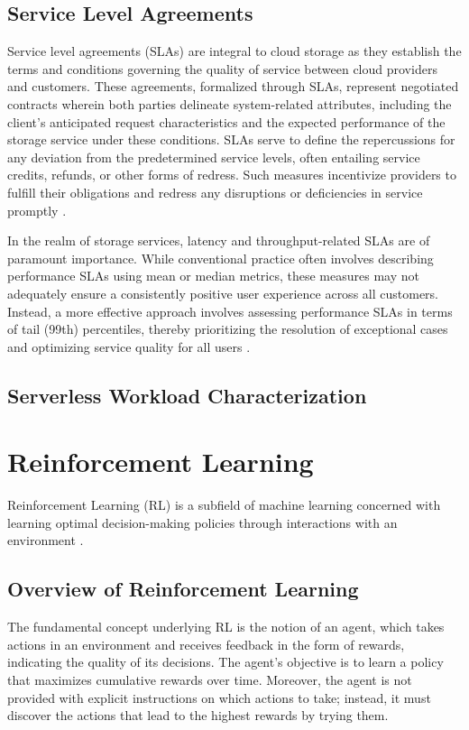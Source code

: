 \subsection{Service Level Agreements}
Service level agreements (SLAs) are integral to cloud storage as they establish the terms and conditions governing the quality of service between cloud providers and customers. These agreements, formalized through SLAs, represent negotiated contracts wherein both parties delineate system-related attributes, including the client's anticipated request characteristics and the expected performance of the storage service under these conditions. SLAs serve to define the repercussions for any deviation from the predetermined service levels, often entailing service credits, refunds, or other forms of redress. Such measures incentivize providers to fulfill their obligations and redress any disruptions or deficiencies in service promptly \cite{DeCandia2007,180275,tariq2020sequoia}.

In the realm of storage services, latency and throughput-related SLAs are of paramount importance. While conventional practice often involves describing performance SLAs using mean or median metrics, these measures may not adequately ensure a consistently positive user experience across all customers. Instead, a more effective approach involves assessing performance SLAs in terms of tail (99th) percentiles, thereby prioritizing the resolution of exceptional cases and optimizing service quality for all users \cite{DeCandia2007}.

\subsection*{Serverless Workload Characterization}

\section{Reinforcement Learning}

Reinforcement Learning (RL) is a subfield of machine learning concerned with learning optimal decision-making policies through interactions with an environment \cite{sutton2018reinforcement}. 

\subsection{Overview of Reinforcement Learning}
The fundamental concept underlying RL is the notion of an agent, which takes actions in an environment and receives feedback in the form of rewards, indicating the quality of its decisions. The agent's objective is to learn a policy that maximizes cumulative rewards over time. Moreover, the agent is not provided with explicit instructions on which actions to take; instead, it must discover the actions that lead to the highest rewards by trying them.


